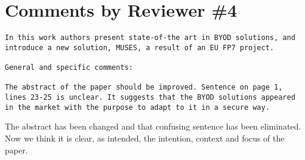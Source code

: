 \documentclass[preprint]{elsarticle}
\begin{document}
\section{Comments by Reviewer \#4}

\begin{verbatim}
In this work authors present state-of-the art in BYOD solutions, and introduce a new solution, MUSES, a result of an EU FP7 project.

General and specific comments:

The abstract of the paper should be improved. Sentence on page 1,
lines 23-25 is unclear. It suggests that the BYOD solutions appeared
in the market with the purpose to adapt to it in a secure way. 
\end{verbatim}

The abstract has been changed and that confusing sentence has been
eliminated. Now we think it is clear, as intended, the intention,
context and focus of
the paper. 
\end{document}
